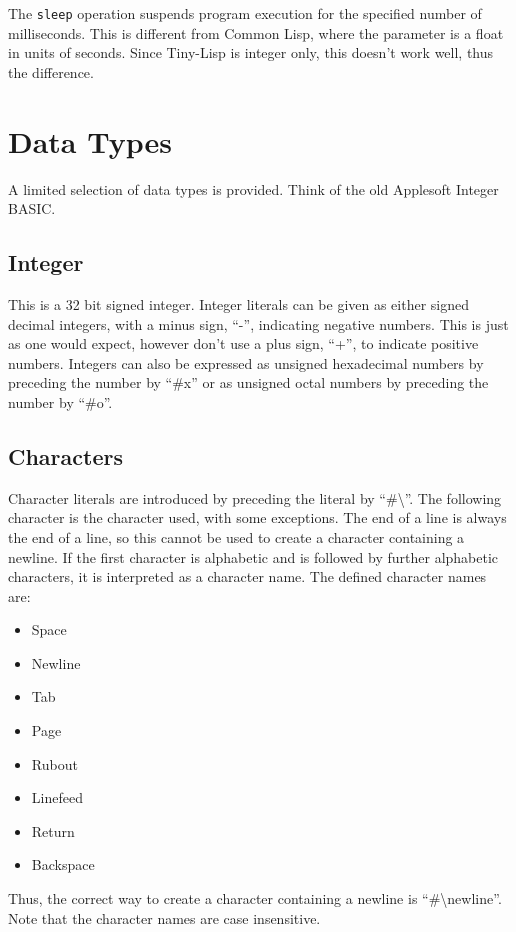 \documentclass[10pt, openany]{book}
\newcommand{\function}[1]{\texttt{#1}}
\newcommand{\tl}{Tiny-Lisp}
\newcommand{\cl}{Common Lisp}
\begin{document}
The \function{sleep} operation suspends program execution for the specified number of milliseconds.  This is different from \cl, where the parameter is a float in units of seconds.  Since \tl{} is integer only, this doesn't work well, thus the difference.

\section{Data Types}
A limited selection of data types is provided.  Think of the old Applesoft Integer BASIC.

\subsection{Integer}
This is a 32 bit signed integer.  Integer literals can be given as either signed decimal integers, with a minus sign, ``-'', indicating negative numbers.  This is just as one would expect, however don't use a plus sign, ``+'', to indicate positive numbers.  Integers can also be expressed as unsigned hexadecimal numbers by preceding the number by ``\#x'' or as unsigned octal numbers by preceding the number by ``\#o''.

\subsection{Characters}
Character literals are introduced by preceding the literal by ``\#\textbackslash''.  The following character is the character used, with some exceptions.  The end of a line is always the end of a line, so this cannot be used to create a character containing a newline.  If the first character is alphabetic and is followed by further alphabetic characters, it is interpreted as a character name.  The defined character names are:
\begin{itemize}
\item Space
\item Newline
\item Tab
\item Page
\item Rubout
\item Linefeed
\item Return
\item Backspace
\end{itemize}
Thus, the correct way to create a character containing a newline is ``\#\textbackslash{}newline''.  Note that the character names are case insensitive.
\end{document}
